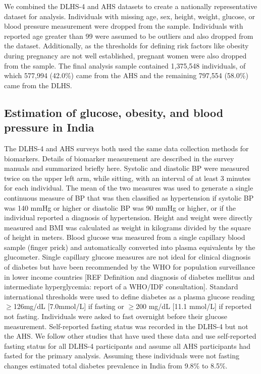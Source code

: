\documentclass[10pt,letterpaper]{article}
\numberwithin{equation}{section}
\begin{document}
We combined the DLHS-4 and AHS datasets to create a nationally representative dataset for analysis. Individuals with missing age, sex, height, weight, glucose, or blood pressure measurement were dropped from the sample. Individuals with reported age greater than 99 were assumed to be outliers and also dropped from the dataset. Additionally, as the thresholds for defining risk factors like obesity during pregnancy are not well established, pregnant women were also dropped from the sample. The final analysis sample contained 1,375,548 individuals, of which 577,994 (42.0\%) came from the AHS and the remaining 797,554 (58.0\%) came from the DLHS.

\subsection{Estimation of glucose, obesity, and blood pressure in India}
The DLHS-4 and AHS surveys both used the same data collection methods for biomarkers. Details of biomarker measurement are described in the survey manuals and summarized briefly here.\cite{noauthor_annual_2014} Systolic and diastolic BP were measured twice on the upper left arm, while sitting, with an interval of at least 3 minutes for each individual. The mean of the two measures was used to generate a single continuous measure of BP that was then classified as hypertension if systolic BP was 140 mmHg or higher or diastolic BP was 90 mmHg or higher, or if the individual reported a diagnosis of hypertension. Height and weight were directly measured and BMI was calculated as weight in kilograms divided by the square of height in meters. Blood glucose was measured from a single capillary blood sample (finger prick) and automatically converted into plasma equivalents by the glucometer. Single capillary glucose measures are not ideal for clinical diagnosis of diabetes but have been recommended by the WHO for population surveillance in lower income countries [REF Definition and diagnosis of diabetes mellitus and intermediate hyperglycemia: report of a WHO/IDF consultation]. Standard international thresholds were used to define diabetes as a plasma glucose reading $\geq$126mg/dL [7.0mmol/L] if fasting or $\geq$200 mg/dL [11.1 mmol/L] if reported not fasting. Individuals were asked to fast overnight before their glucose measurement. Self-reported fasting status was recorded in the DLHS-4 but not the AHS. We follow other studies that have used these data and use self-reported fasting status for all DLHS-4 participants and assume all AHS participants had fasted for the primary analysis. \cite{geldsetzer2018,bischops2019} Assuming these individuals were not fasting changes estimated total diabetes prevalence in India from 9.8\% to 8.5\%.
\end{document}
